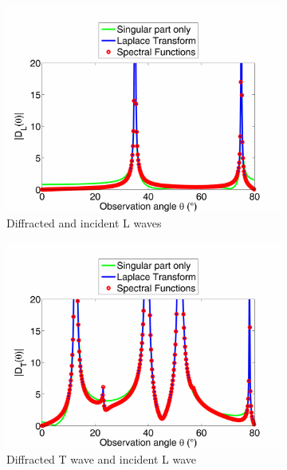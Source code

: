\begin{figure}%
\centering
    \begin{subfigure}[b]{0.49\textwidth}
        \includegraphics[width=\textwidth]{images/chapter3/Figure8a.pdf}
        \caption{Diffracted and incident L waves}
        \label{8055LL}
    \end{subfigure}  
    \begin{subfigure}[b]{0.49\textwidth}
        \includegraphics[width=\textwidth]{images/chapter3/Figure8b.pdf}
        \caption{Diffracted T wave and incident L wave}
        \label{8055LT}
     \end{subfigure} \\   
     \begin{subfigure}[b]{0.49\textwidth}

\end{subfigure}
\end{figure}
